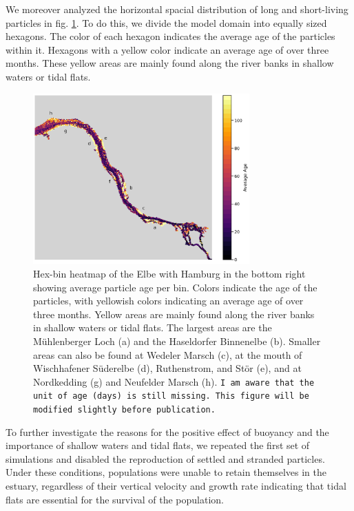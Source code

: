 \documentclass[npg, manuscript]{copernicus}
\begin{document}
We moreover analyzed the horizontal spacial distribution of long and short-living particles in fig. \ref{fig:migration-long-vs-short-heatmap}.
To do this, we divide the model domain into equally sized hexagons.
The color of each hexagon indicates the average age of the particles within it.
Hexagons with a yellow color indicate an average age of over three months.
These yellow areas are mainly found along the river banks in shallow waters or tidal flats.

\begin{figure}
    \includegraphics[width=8.3cm]{figures/age_hexbin.png}
    \caption[]{
        Hex-bin heatmap of the Elbe with Hamburg in the bottom right showing average particle age per bin.
        Colors indicate the age of the particles, with yellowish colors indicating an average age of over three months.
        Yellow areas are mainly found along the river banks in shallow waters or tidal flats.
        The largest areas are the Mühlenberger Loch (a) and the Haseldorfer Binnenelbe (b).
        Smaller areas can also be found at Wedeler Marsch (c), at the mouth of Wischhafener Süderelbe (d), Ruthenstrom, and Stör (e), and at Nordkedding (g) and Neufelder Marsch (h).
        \texttt{I am aware that the unit of age (days) is still missing. This figure will be modified slightly before publication.}
        }
    \label{fig:migration-long-vs-short-heatmap}
\end{figure}

To further investigate the reasons for the positive effect of buoyancy and the importance of shallow waters and tidal flats, we repeated the first set of simulations and disabled the reproduction of settled and stranded particles.
Under these conditions, populations were unable to retain themselves in the estuary, regardless of their vertical velocity and growth rate indicating that tidal flats are essential for the survival of the population.
\end{document}
